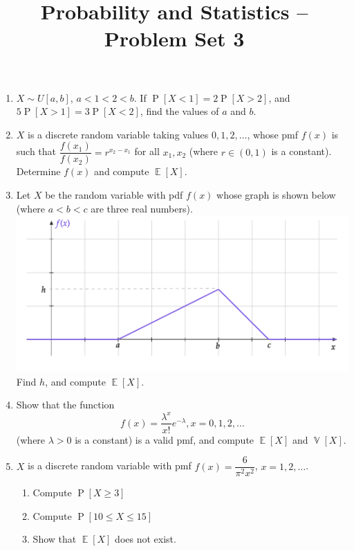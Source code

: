 \documentclass[svgnames]{amsart}
\title[]{Probability and Statistics -- Problem Set 3}
\DeclareMathOperator{\Prob}{P}
\DeclareMathOperator{\EV}{\mathbb E}
\DeclareMathOperator{\Var}{\mathbb V}
\begin{document}
\maketitle
\begin{enumerate}
\item $X \sim U[a,b]$, $a < 1 < 2 < b$. If $\Prob[X < 1] = 2\Prob[X > 2]$, and $5\Prob[X > 1] = 3\Prob[X < 2]$, find the values of $a$ and $b$.

\item $X$ is a discrete random variable taking values $0, 1, 2, \ldots$, whose pmf $f(x)$ is such that $\dfrac{f(x_1)}{f(x_2)} = r^{x_2 - x_1}$ for all $x_1, x_2$ (where $r \in (0, 1)$ is a constant). Determine $f(x)$ and compute $\EV[X]$.

\item Let $X$ be the random variable with pdf $f(x)$ whose graph is shown below (where $a < b < c$ are three real numbers).\\
\includegraphics[scale=0.6]{Set3Graph.pdf}\\
Find $h$, and compute $\EV[X]$.

\item Show that the function
\begin{equation*}
f(x) = \dfrac{\lambda^x}{x!}e^{-\lambda}, x = 0, 1, 2, \ldots
\end{equation*}
(where $\lambda > 0$ is a constant) is a valid pmf, and compute $\EV[X]$ and $\Var[X]$.

\item $X$ is a discrete random variable with pmf $f(x) = \dfrac{6}{\pi^2 x^2}$, $x = 1, 2, \ldots$.
\begin{enumerate}
	\item Compute $\Prob[X \ge 3]$
	\item Compute $\Prob[10 \le X \le 15]$
	\item Show that $\EV[X]$ does not exist.
\end{enumerate}


\end{enumerate}
\end{document}
